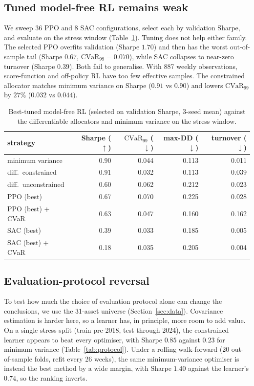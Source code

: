 \documentclass[sigconf]{acmart}
\begin{document}
\subsection{Tuned model-free RL remains weak}
\label{sec:modelfree}
We sweep 36 PPO and 8 SAC configurations, select each by validation Sharpe, and
evaluate on the stress window (Table~\ref{tab:modelfree}). Tuning does not help either family.
The selected PPO overfits validation (Sharpe $1.70$) and then has the worst out-of-sample
tail (Sharpe $0.67$, $\mathrm{CVaR}_{99}=0.070$), while SAC collapses to near-zero turnover
(Sharpe $0.39$). Both fail to generalise. With 887 weekly observations, score-function and
off-policy RL have too few effective samples. The constrained allocator matches minimum
variance on Sharpe ($0.91$ vs $0.90$) and lowers $\mathrm{CVaR}_{99}$ by $27\%$ ($0.032$ vs
$0.044$).

\begin{table}[t]
\centering
\caption{Best-tuned model-free RL (selected on validation Sharpe, 3-seed mean) against the differentiable allocators and minimum variance on the stress window.}
\label{tab:modelfree}
\footnotesize
\begin{tabular}{lrrrr}
\toprule
strategy & Sharpe ($\uparrow$) & $\mathrm{CVaR}_{99}$ ($\downarrow$) & max-DD ($\downarrow$) & turnover ($\downarrow$) \\
\midrule
minimum variance        & 0.90 & 0.044 & 0.113 & 0.011 \\
diff.\ constrained & 0.91 & 0.032 & 0.113 & 0.039 \\
diff.\ unconstrained    & 0.60 & 0.062 & 0.212 & 0.023 \\
PPO (best)              & 0.67 & 0.070 & 0.225 & 0.028 \\
PPO (best) + CVaR       & 0.63 & 0.047 & 0.160 & 0.162 \\
SAC (best)              & 0.39 & 0.033 & 0.185 & 0.005 \\
SAC (best) + CVaR       & 0.18 & 0.035 & 0.205 & 0.004 \\
\bottomrule
\end{tabular}
\end{table}

\subsection{Evaluation-protocol reversal}
\label{sec:protocol}
To test how much the choice of evaluation protocol alone can change the conclusions, we
use the 31-asset universe (Section~\ref{sec:data}). Covariance estimation is harder here, so a learner has, in principle, more
room to add value. On a single stress split (train pre-2018, test through 2024), the constrained
learner appears to beat every optimiser, with Sharpe $0.85$ against $0.23$ for minimum
variance (Table~\ref{tab:protocol}). Under a rolling walk-forward (20 out-of-sample folds, refit
every 26 weeks), the same minimum-variance optimiser is instead the best method by a
wide margin, with Sharpe $1.40$ against the learner's $0.74$, so the ranking inverts.
\end{document}
